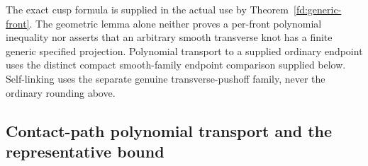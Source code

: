 \begin{remark}\label{ce:scope}
The exact cusp formula is supplied in the actual use by
Theorem~\ref{fd:generic-front}. The geometric lemma alone neither proves
a per-front polynomial inequality nor asserts that an arbitrary smooth
transverse knot has a finite generic specified projection. Polynomial
transport to a supplied ordinary endpoint uses the distinct compact
smooth-family endpoint comparison supplied below.
Self-linking uses the separate genuine transverse-pushoff family, never
the ordinary rounding above.
\end{remark}

\subsection{Contact-path polynomial transport and the representative bound}

